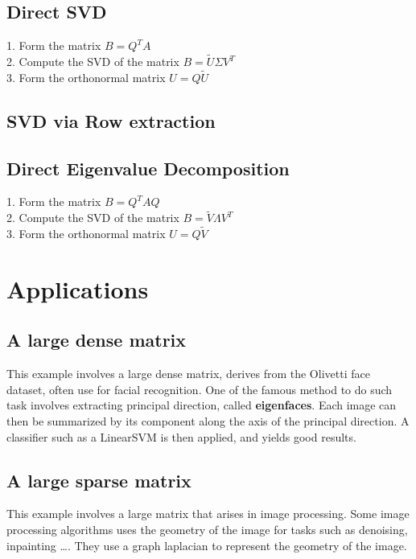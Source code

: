 \documentclass[onecolumn,12pt]{article}
\begin{document}
\subsection{Direct SVD}

1. Form the matrix $B = Q^T A$ \\
2. Compute the SVD of the matrix $ B = \tilde{U}\Sigma V^T$ \\
3. Form the orthonormal matrix $U = Q \tilde{U}$ \\

\subsection{SVD via Row extraction}

\subsection{Direct Eigenvalue Decomposition}
1. Form the matrix $B = Q^T A Q$ \\
2. Compute the SVD of the matrix $ B = \tilde{V}\Lambda V^T$ \\
3. Form the orthonormal matrix $U = Q \tilde{V}$ \\


\section{Applications}
\subsection{A large dense matrix}
This example involves a large dense matrix, derives from the Olivetti face
dataset, often use for facial recognition. One of the famous method to do such
task involves extracting principal direction, called \textbf{eigenfaces}. Each
image can then be summarized by its component along the axis of the principal
direction. A classifier such as a LinearSVM is then applied, and yields good
results.




\subsection{A large sparse matrix}

This example involves a large matrix that arises in image processing. Some
image processing algorithms uses the geometry of the image for tasks such as
denoising, inpainting \dots. They use a graph laplacian to represent the
geometry of the image.
\end{document}
